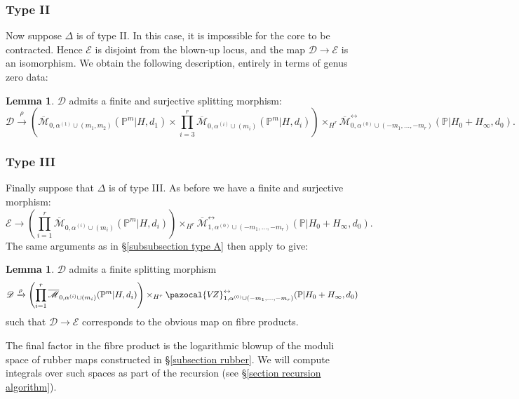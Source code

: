 \documentclass[11pt]{amsart}
\newcommand{\PP}{\mathbb P}
\newcommand{\VZ}{\pazocal{V\!Z}}
\renewcommand{\to}{\rightarrow}
\newcommand{\Mcal}{\mathcal{M}}
\newcommand{\Dcal}{\mathcal{D}}
\newcommand{\Ecal}{\mathcal{E}}
\newcommand{\ol}[1]{\overline{#1}}
\theoremstyle{definition}
\newtheorem{lemma}[thm]{Lemma}
\theoremstyle{definition}
\begin{document}
\subsubsection{Type II}
Now suppose $\Delta$ is of type II. In this case, it is impossible for the core to be contracted. Hence $\Ecal$ is disjoint from the blown-up locus, and the map $\Dcal \to \Ecal$ is an isomorphism. We obtain the following description, entirely in terms of genus zero data:
\begin{lemma} $\Dcal$ admits a finite and surjective splitting morphism:
\begin{equation*} \Dcal \xrightarrow{\rho} \left(\ol\Mcal_{0,\alpha^{(1)}\cup(m_1,m_2)}(\PP^m|H,d_1)\times\prod_{i=3}^r \ol\Mcal_{0,\alpha^{(i)}\cup(m_i)}(\PP^m|H,d_i)\right) \times_{H^r} \ol\Mcal^{\leftrightarrow}_{0,\alpha^{(0)}\cup(-m_1,\ldots,-m_r)}(\mathbb P|H_0+H_\infty,d_0).\end{equation*}\end{lemma}

\subsubsection{Type III} \label{subsubsection type C+} Finally suppose that $\Delta$ is of type III. As before we have a finite and surjective morphism:
\begin{equation*} \Ecal \to  \left( \prod_{i=1}^r \ol\Mcal_{0,\alpha^{(i)}\cup(m_i)}(\PP^m|H,d_i) \right) \times_{H^r} \ol\Mcal^{\leftrightarrow}_{1,\alpha^{(0)}\cup(-m_1,\ldots,-m_r)}(\mathbb{P}|H_0+H_\infty,d_0). \end{equation*}
The same arguments as in \S \ref{subsubsection type A} then apply to give:
\begin{lemma} $\Dcal$ admits a finite splitting morphism
\begin{equation*}\Dcal \xrightarrow{\rho} \left( \prod_{i=1}^r \ol\Mcal_{0,\alpha^{(i)}\cup(m_i)}(\PP^m|H,d_i) \right) \times_{H^r} \VZ^{\leftrightarrow}_{1,\alpha^{(0)}\cup(-m_1,\ldots,-m_r)}(\mathbb{P}|H_0+H_\infty,d_0)\end{equation*}
such that $\Dcal \to \Ecal$ corresponds to the obvious map on fibre products.\end{lemma}
\noindent The final factor in the fibre product is the logarithmic blowup of the moduli space of rubber maps constructed in \S \ref{subsection rubber}. We will compute integrals over such spaces as part of the recursion (see \S \ref{section recursion algorithm}).
\end{document}
